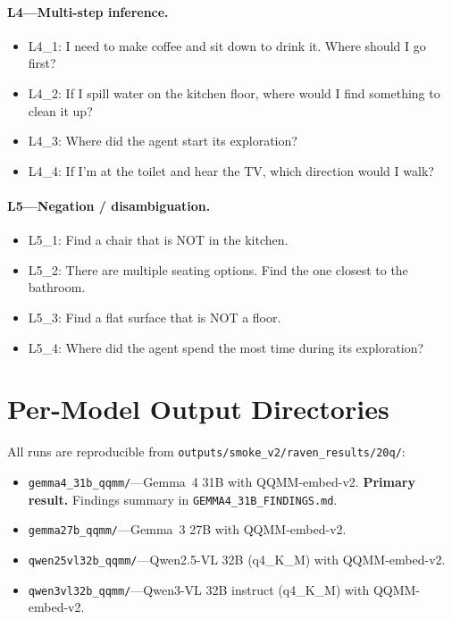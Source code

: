 \documentclass[12pt,letterpaper,oneside]{article}
\begin{document}
\paragraph{L4---Multi-step inference.}
\begin{itemize}\setlength\itemsep{0pt}
  \item L4\_1: I need to make coffee and sit down to drink it.  Where
    should I go first?
  \item L4\_2: If I spill water on the kitchen floor, where would I
    find something to clean it up?
  \item L4\_3: Where did the agent start its exploration?
  \item L4\_4: If I'm at the toilet and hear the TV, which direction
    would I walk?
\end{itemize}

\paragraph{L5---Negation / disambiguation.}
\begin{itemize}\setlength\itemsep{0pt}
  \item L5\_1: Find a chair that is NOT in the kitchen.
  \item L5\_2: There are multiple seating options.  Find the one
    closest to the bathroom.
  \item L5\_3: Find a flat surface that is NOT a floor.
  \item L5\_4: Where did the agent spend the most time during its
    exploration?
\end{itemize}

\section{Per-Model Output Directories}\label{app:outputs}

All runs are reproducible from
\texttt{outputs/smoke\_v2/raven\_results/20q/}:

\begin{itemize}\setlength\itemsep{0pt}
  \item \texttt{gemma4\_31b\_qqmm/}---Gemma~4 31B with QQMM-embed-v2.
    \textbf{Primary result.} Findings summary in
    \texttt{GEMMA4\_31B\_FINDINGS.md}.
  \item \texttt{gemma27b\_qqmm/}---Gemma~3 27B with QQMM-embed-v2.
  \item \texttt{qwen25vl32b\_qqmm/}---Qwen2.5-VL 32B (q4\_K\_M) with
    QQMM-embed-v2.
  \item \texttt{qwen3vl32b\_qqmm/}---Qwen3-VL 32B instruct (q4\_K\_M)
    with QQMM-embed-v2.
\end{itemize}
\end{document}

